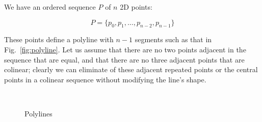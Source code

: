 \documentclass{article}
\begin{document}
We have an ordered sequence $P$ of $n$ 2D points:

\begin{equation}
  \label{eq:points}
  P = \{ p_{0}, p_{1},\ldots,p_{n-2},p_{n-1}\}
\end{equation}

These points define a polyline with $n-1$ segments such as that in Fig.~\ref{fig:polyline}.  Let us assume that there are no two points adjacent in the sequence that are equal, and that there are no three adjacent points that are colinear; clearly we can eliminate of these adjacent repeated points or the central points in a colinear sequence without modifying the line's shape.

\begin{figure}[h]
  \centering
  \hfill
  \\
  \caption{Polylines}
\end{figure}
\end{document}
